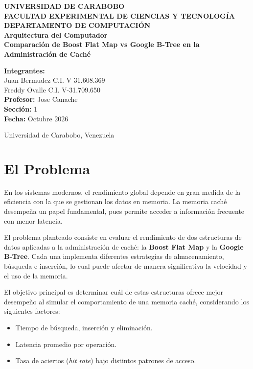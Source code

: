 \documentclass[12pt,a4paper]{article}
\begin{document}
\begin{titlepage}
\centering
{\large \textbf{UNIVERSIDAD DE CARABOBO}}\\[0.2cm]
{\large \textbf{FACULTAD EXPERIMENTAL DE CIENCIAS Y TECNOLOGÍA}}\\[0.2cm]
{\large \textbf{DEPARTAMENTO DE COMPUTACIÓN}}\\[0.2cm]
{\Large \textbf{Arquitectura del Computador}}\\[2cm]
{\LARGE \textbf{Comparación de Boost Flat Map vs Google B-Tree en la Administración de Caché}}\\[3cm]

\begin{flushleft}
\textbf{Integrantes:}\\
Juan Bermudez \hspace{0.3cm} C.I. V-31.608.369\\
Freddy Ovalle \hspace{0.3cm} C.I. V-31.709.650\\[1cm]

\textbf{Profesor:} Jose Canache\\[1cm]
\textbf{Sección:} 1\\[1cm]
\textbf{Fecha:} Octubre 2026
\end{flushleft}

\vfill

{\large Universidad de Carabobo, Venezuela}
\end{titlepage}

\tableofcontents
\newpage

\section{El Problema}

En los sistemas modernos, el rendimiento global depende en gran medida de la eficiencia con la que se gestionan los datos en memoria.  
La memoria caché desempeña un papel fundamental, pues permite acceder a información frecuente con menor latencia.

El problema planteado consiste en evaluar el rendimiento de dos estructuras de datos aplicadas a la administración de caché:  
la \textbf{Boost Flat Map} y la \textbf{Google B-Tree}.  
Cada una implementa diferentes estrategias de almacenamiento, búsqueda e inserción, lo cual puede afectar de manera significativa la velocidad y el uso de la memoria.

El objetivo principal es determinar cuál de estas estructuras ofrece mejor desempeño al simular el comportamiento de una memoria caché,  
considerando los siguientes factores:
\begin{itemize}
    \item Tiempo de búsqueda, inserción y eliminación.
    \item Latencia promedio por operación.
    \item Tasa de aciertos (\textit{hit rate}) bajo distintos patrones de acceso.
\end{itemize}
\end{document}
